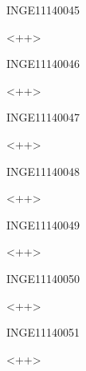 \documentclass{article}
\begin{document}
\begin{corrige}{INGE11140045}

<++>

\end{corrige}%


\begin{corrige}{INGE11140046}

<++>

\end{corrige}%


\begin{corrige}{INGE11140047}

<++>

\end{corrige}%


\begin{corrige}{INGE11140048}

<++>

\end{corrige}%


\begin{corrige}{INGE11140049}

<++>

\end{corrige}%


\begin{corrige}{INGE11140050}

<++>

\end{corrige}%


\begin{corrige}{INGE11140051}

<++>

\end{corrige}%
\end{document}
